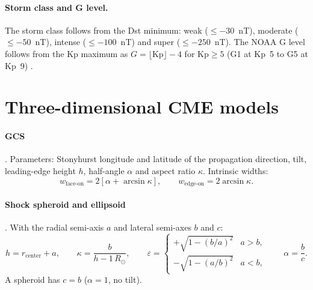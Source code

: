 \paragraph{Storm class and G level.} The storm class follows \textcite{gonzalez1994} from the
Dst minimum: weak (\(\leq -30\)~nT), moderate (\(\leq -50\)~nT), intense (\(\leq -100\)~nT) and
super (\(\leq -250\)~nT). The NOAA G level follows from the Kp maximum as
\(G = \lfloor \mathrm{Kp}\rfloor - 4\) for \(\mathrm{Kp}\geq5\) (G1 at Kp~5 to G5 at Kp~9)
\parencite{noaascales}.

\section{Three-dimensional CME models}

\paragraph{GCS} \parencite{thernisien2006,thernisien2011}. Parameters: Stonyhurst longitude and
latitude of the propagation direction, tilt, leading-edge height \(h\), half-angle \(\alpha\) and
aspect ratio \(\kappa\). Intrinsic widths:
\begin{equation}
  w_\text{face-on} = 2\left[\alpha + \arcsin\kappa\right],\qquad
  w_\text{edge-on} = 2\arcsin\kappa.
\end{equation}

\paragraph{Shock spheroid and ellipsoid} \parencite{kouloumvakos2022}. With the radial semi-axis
\(a\) and lateral semi-axes \(b\) and \(c\):
\begin{equation}
  h = r_\text{center} + a,\qquad \kappa = \frac{b}{h - 1\,R_\odot},\qquad
  \varepsilon = \begin{cases} +\sqrt{1-(b/a)^2} & a > b,\\ -\sqrt{1-(a/b)^2} & a < b,\end{cases}
  \qquad \alpha = \frac{b}{c}.
\end{equation}
A spheroid has \(c = b\) (\(\alpha = 1\), no tilt).
